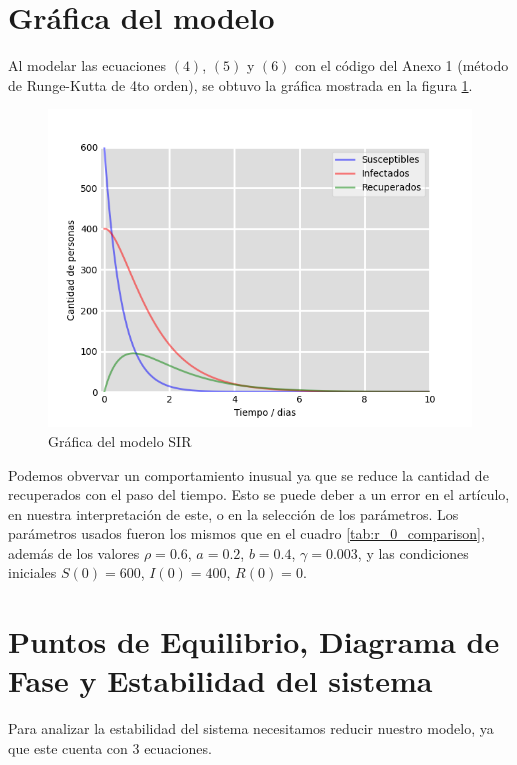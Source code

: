 \documentclass{article}
\begin{document}
\section{Gr\'afica del modelo}

Al modelar las ecuaciones $(4)$, $(5)$ y $(6)$ con el c\'odigo del Anexo 1 (m\'etodo de Runge-Kutta de 4to orden), se obtuvo la gr\'afica mostrada en la figura \ref{fig:model_graph}.

\begin{figure}[H]
    \centering
    \includegraphics[width=1\textwidth]{./images/Figure_1.png}
    \caption{Gr\'afica del modelo SIR}
    \label{fig:model_graph}
\end{figure}

Podemos obvervar un comportamiento inusual ya que se  reduce la cantidad de recuperados con el paso del tiempo. Esto se puede deber a un error en el art\'iculo, en nuestra interpretaci\'on de este, o en la selecci\'on de los par\'ametros. Los par\'ametros usados fueron los mismos que en el cuadro \ref{tab:r_0_comparison}, adem\'as de los valores $\rho=0.6$, $a=0.2$, $b=0.4$, $\gamma=0.003$, y las condiciones iniciales $S(0)=600$, $I(0)=400$, $R(0)=0$.

\section{Puntos de Equilibrio, Diagrama de Fase y Estabilidad del sistema}

Para analizar la estabilidad del sistema necesitamos reducir nuestro modelo, ya que este cuenta con 3 ecuaciones. 
\end{document}
